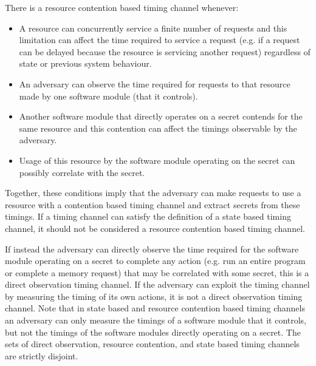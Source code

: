 There is a resource contention based timing channel whenever:
\begin{itemize}
    \item A resource can concurrently service a finite number of requests and 
        this limitation can affect the time required to service a request (e.g.  
        if a request can be delayed because the resource is servicing another 
        request) regardless of state or previous system behaviour.
    \item An adversary can observe the time required for requests to that 
        resource made by one software module (that it controls).
    \item Another software module that directly operates on a secret contends 
        for the same resource and this contention can affect the timings 
        observable by the adversary.
    \item Usage of this resource by the software module operating on the secret 
        can possibly correlate with the secret.
\end{itemize}
Together, these conditions imply that the adversary can make requests to use a 
resource with a contention based timing channel and extract secrets from these 
timings. If a timing channel can satisfy the definition of a state based timing 
channel, it should not be considered a resource contention based timing 
channel.

If instead the adversary can directly observe the time required for the 
software module operating on a secret to complete any action (e.g. run an 
entire program or complete a memory request) that may be correlated with some 
secret, this is a direct observation timing channel. If the adversary can 
exploit the timing channel by measuring the timing of its own actions, it is 
not a direct observation timing channel. Note that in state based and resource 
contention based timing channels an adversary can only measure the timings of a 
software module that it controls, but not the timings of the software modules 
directly operating on a secret. The sets of direct observation, resource 
contention, and state based timing channels are strictly disjoint.

